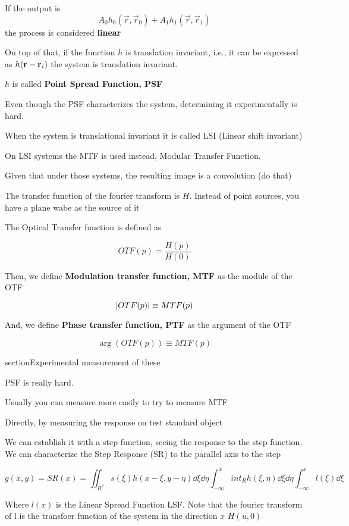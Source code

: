 \documentclass[../main/main.tex]{subfiles}
\begin{document}
If the output is
\begin{equation}
	A_0 h_0(\vec{r}, \vec{r}_0) + A_1 h_1(\vec{r}, \vec{r}_1)
\end{equation}
the process is considered \textbf{linear}

On top of that, if the function $h$ is translation invariant, i.e., it can be expressed as $h(\vb{r} - \vb{r}_i)$
the system is translation invariant.

$h$ is called \textbf{Point Spread Function, PSF}

Even though the PSF characterizes the system, determining it experimentally is hard.

When the system is translational invariant it is called LSI (Linear shift invariant)

On LSI systems the MTF is used instead, Modular Transfer Function.

Given that under those systems, the resulting image is a convolution (do that)


The transfer function of the fourier transform is $H$.
Instead of point sources, you have a plane wabe as the source of it

The Optical Transfer function is defined as

\begin{equation}
	OTF(p) = \frac {H(p)} {H(0)}
\end{equation}

Then, we define \textbf{Modulation transfer function, MTF} as the module of the OTF

\begin{equation}
	\abs{OTF(p)} \equiv MTF(p)
\end{equation}

And, we define \textbf{Phase transfer function, PTF} as the argument of the OTF

\begin{equation}
	\arg(OTF(p)) \equiv MTF(p)
\end{equation}

section{Experimental measurement of these}

PSF is really hard.

Usually you can measure more easily to try to measure MTF

Directly, by measuring the response on test standard object

We can establish it with a step function, seeing the response to the step function. We can characterize the Step Response (SR) to the parallel axis to the step

\begin{equation}
	g(x,y) = SR(x) =
	\iint_{R^2} s(\xi)h(x-\xi, y -\eta)\dd \xi \dd \eta
	\int_{-\infty}^x int_{R} h(\xi, \eta)\dd \xi \dd \eta
	\int_{-\infty}^x l(\xi)\dd \xi
\end{equation}

Where $l(x)$ is the Linear Spread Function LSF. Note that the fourier transform of l is the transfoer function of the system in the direction $x$ $H(u, 0)$
\end{document}
